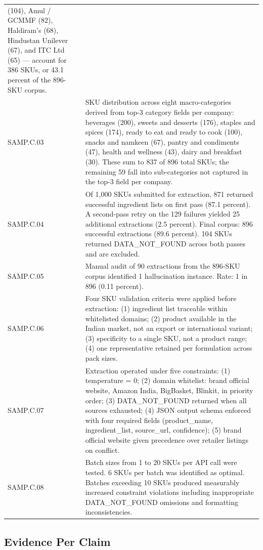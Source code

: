 \documentclass[
  letterpaper,
  DIV=11,
  numbers=noendperiod]{scrartcl}
\begin{document}
{\begin{longtable}[]{@{}
  >{\raggedright\arraybackslash}p{}
  >{\raggedright\arraybackslash}p{}@{}}
(104), Amul / GCMMF (82), Haldiram's (68), Hindustan Unilever (67), and
ITC Ltd (65) --- account for 386 SKUs, or 43.1 percent of the 896-SKU
corpus. \\
SAMP.C.03 & SKU distribution across eight macro-categories derived from
top-3 category fields per company: beverages (200), sweets and desserts
(176), staples and spices (174), ready to eat and ready to cook (100),
snacks and namkeen (67), pantry and condiments (47), health and wellness
(43), dairy and breakfast (30). These sum to 837 of 896 total SKUs; the
remaining 59 fall into sub-categories not captured in the top-3 field
per company. \\
SAMP.C.04 & Of 1,000 SKUs submitted for extraction, 871 returned
successful ingredient lists on first pass (87.1 percent). A second-pass
retry on the 129 failures yielded 25 additional extractions (2.5
percent). Final corpus: 896 successful extractions (89.6 percent). 104
SKUs returned DATA\_NOT\_FOUND across both passes and are excluded. \\
SAMP.C.05 & Manual audit of 90 extractions from the 896-SKU corpus
identified 1 hallucination instance. Rate: 1 in 896 (0.11 percent). \\
SAMP.C.06 & Four SKU validation criteria were applied before extraction:
(1) ingredient list traceable within whitelisted domains; (2) product
available in the Indian market, not an export or international variant;
(3) specificity to a single SKU, not a product range; (4) one
representative retained per formulation across pack sizes. \\
SAMP.C.07 & Extraction operated under five constraints: (1) temperature
= 0; (2) domain whitelist: brand official website, Amazon India,
BigBasket, Blinkit, in priority order; (3) DATA\_NOT\_FOUND returned
when all sources exhausted; (4) JSON output schema enforced with four
required fields (product\_name, ingredient\_list, source\_url,
confidence); (5) brand official website given precedence over retailer
listings on conflict. \\
SAMP.C.08 & Batch sizes from 1 to 20 SKUs per API call were tested. 6
SKUs per batch was identified as optimal. Batches exceeding 10 SKUs
produced measurably increased constraint violations including
inappropriate DATA\_NOT\_FOUND omissions and formatting
inconsistencies. \\
\end{longtable}
}

\subsection{Evidence Per Claim}\label{evidence-per-claim}
\end{document}
